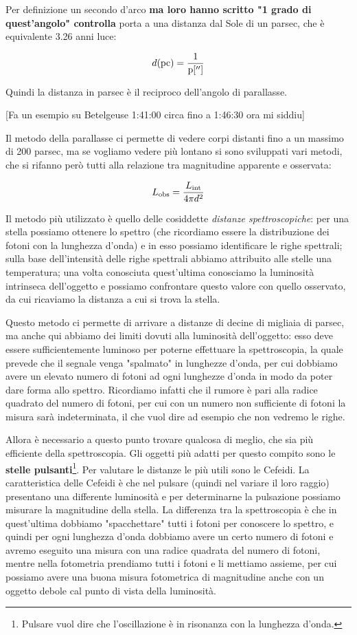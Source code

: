 Per definizione un secondo d'arco
\textbf{ma loro hanno scritto "1 grado di quest'angolo" controlla}
porta a una distanza dal Sole di un parsec, che è equivalente 3.26 anni luce:

$$d\rm (pc)=\frac{1}{p['']} $$

Quindi la distanza in parsec è il reciproco dell'angolo di parallasse.

[Fa un esempio su Betelgeuse 1:41:00 circa fino a 1:46:30 ora mi siddiu]

Il metodo della parallasse ci permette di vedere corpi distanti fino a un massimo di 200 parsec, ma se vogliamo vedere più lontano si sono sviluppati vari metodi, che si rifanno però tutti alla relazione tra magnitudine apparente e osservata:

$$L_{\rm obs}=\frac{L_{\rm int}}{4\pi d^{2}}$$

Il metodo più utilizzato è quello delle cosiddette \textit{distanze spettroscopiche}: per una stella possiamo ottenere lo spettro (che ricordiamo essere la distribuzione dei fotoni con la lunghezza d'onda) e in esso possiamo identificare le righe spettrali; sulla base dell'intensità delle righe spettrali abbiamo attribuito alle stelle una temperatura; una volta conosciuta quest'ultima conosciamo la luminosità intrinseca dell'oggetto e possiamo confrontare questo valore con quello osservato, da cui ricaviamo la distanza a cui si trova la stella.

Questo metodo ci permette di arrivare a distanze di decine di migliaia di parsec, ma anche qui abbiamo dei limiti dovuti alla luminosità dell'oggetto: esso deve essere sufficientemente luminoso per poterne effettuare la spettroscopia, la quale prevede che il segnale venga "spalmato" in lunghezze d'onda, per cui dobbiamo avere un elevato numero di fotoni ad ogni lunghezze d'onda in modo da poter dare forma allo spettro. Ricordiamo infatti che il rumore è pari alla radice quadrato del numero di fotoni, per cui con un numero non sufficiente di fotoni la misura sarà indeterminata, il che vuol dire ad esempio che non vedremo le righe.

Allora è necessario a questo punto trovare qualcosa di meglio, che sia più efficiente della spettroscopia. Gli oggetti più adatti per questo compito sono le \textbf{stelle pulsanti}\footnote{Pulsare vuol dire che l'oscillazione è in risonanza con la lunghezza d'onda.}. Per valutare le distanze le più utili sono le Cefeidi. La caratteristica delle Cefeidi è che nel pulsare (quindi nel variare il loro raggio) presentano una differente luminosità e per determinarne la pulsazione possiamo misurare la magnitudine della stella. La differenza tra la spettroscopia è che in quest'ultima dobbiamo "spacchettare" tutti i fotoni per conoscere lo spettro, e quindi per ogni lunghezza d'onda dobbiamo avere un certo numero di fotoni e avremo eseguito una misura con una radice quadrata del numero di fotoni, mentre nella fotometria prendiamo tutti i fotoni e li mettiamo assieme, per cui possiamo avere una buona misura fotometrica di magnitudine anche con un oggetto debole cal punto di vista della luminosità.


